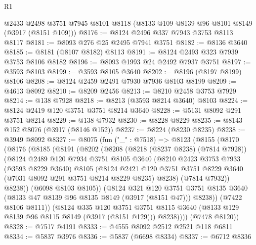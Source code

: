 \begin{lexlean}{R1}
\begin{coremodule}
    @2433
    @2498
    @3751
    @7945
    @8101
    @8118
    (@8133 @109 @8139 @96 @8101 @8149 (@3917 (@8151 @109)))
@8176 := @8124 @2496 @337 @7943 @3753 @8113 @8117
@8181 := @8093 @276 @25 @2495 @7941 @3751
@8182 := @8136 @3640
@8185 := @8181 (@8107 @8182) @8113
@8191 := @8124 @2493 @323 @7939 @3753 @8106 @8182
@8196 := @8093 @1993 @24 @2492 @7937 @3751
@8197 := @3593 @8103
@8199 := @3593 @8105 @3640
@8202 := @8196 (@8197 @8199) @8106
@8208 := @8124 @2459 @2491 @7930 @7936 @8103 @8199
@8209 := @4613 @8092
@8210 := @8209 @2456
@8213 := @8210 @2458 @3753 @7929
@8214 := @138 @7928
@8218 := @8213 (@3593 @8214 @3640) @8103
@8224 := @8124 @2419 @120 @3751 @3751 @8214 @3640
@8228 := @5131 @8092 @291 @3751 @8214
@8229 := @138 @7932
@8230 := @8228 @8229
@8235 := @8143 @152 @8076 (@3917 (@8146 @152))
@8237 := @8224 (@8230 @8235)
@8238 := @3949 @8092
@8327 := @8075
    (fun ("_" : @7518) =>
    @8123
      (@8155
        (@8170
          (@8176
            (@8185
              (@8191
                (@8202
                  (@8208
                    (@8218 (@8237 @8238) (@7814 @7928))
                    (@8124
                      @2489
                      @120
                      @7934
                      @3751
                      @8105
                      @3640
                      (@8210
                        @2423
                        @3753
                        @7933
                        (@3593 @8229 @3640)
                        @8105
                        (@8124
                          @2421
                          @120
                          @3751
                          @3751
                          @8229
                          @3640
                          (@7031 @8092 @291 @3751 @8214 @8229 @8235)
                          @8238)
                        (@7814 @7932))
                      @8238))
                  (@6098 @8103 @8105))
                (@8124
                  @321
                  @120
                  @3751
                  @3751
                  @8135
                  @3640
                  (@8133 @47 @8139 @96 @8135 @8149 (@3917 (@8151 @47)))
                  @8238))
              (@7422 @8106 @8111))
            (@8124
              @335
              @120
              @3751
              @3751
              @8115
              @3640
              (@8133 @129 @8139 @96 @8115 @8149 (@3917 (@8151 @129)))
              @8238))))
      (@7478 @8120))
@8328 := @7517 @4191
@8333 := @4555 @8092 @2512 @2521 @118 @6811
@8334 := @5837 @3976
@8336 := @5837 (@6698 @8334)
@8337 := @6712 @8336

\end{coremodule}
\end{lexlean}
